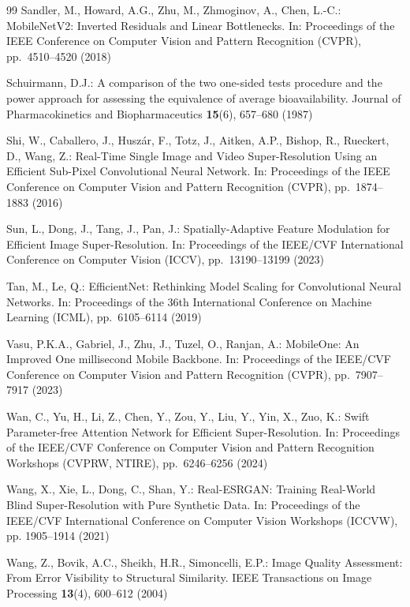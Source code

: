 \documentclass[11pt]{article}
\begin{document}
\begin{thebibliography}{99}
Sandler, M., Howard, A.G., Zhu, M., Zhmoginov, A., Chen, L.-C.:
MobileNetV2: Inverted Residuals and Linear Bottlenecks.
In: Proceedings of the IEEE Conference on Computer Vision and Pattern Recognition (CVPR), pp.\ 4510--4520 (2018)

Schuirmann, D.J.:
A comparison of the two one-sided tests procedure and the power approach for assessing the equivalence of average bioavailability.
Journal of Pharmacokinetics and Biopharmaceutics \textbf{15}(6), 657--680 (1987)

Shi, W., Caballero, J., Husz\'ar, F., Totz, J., Aitken, A.P., Bishop, R., Rueckert, D., Wang, Z.:
Real-Time Single Image and Video Super-Resolution Using an Efficient Sub-Pixel Convolutional Neural Network.
In: Proceedings of the IEEE Conference on Computer Vision and Pattern Recognition (CVPR), pp.\ 1874--1883 (2016)

Sun, L., Dong, J., Tang, J., Pan, J.:
Spatially-Adaptive Feature Modulation for Efficient Image Super-Resolution.
In: Proceedings of the IEEE/CVF International Conference on Computer Vision (ICCV), pp.\ 13190--13199 (2023)

Tan, M., Le, Q.:
EfficientNet: Rethinking Model Scaling for Convolutional Neural Networks.
In: Proceedings of the 36th International Conference on Machine Learning (ICML), pp.\ 6105--6114 (2019)

Vasu, P.K.A., Gabriel, J., Zhu, J., Tuzel, O., Ranjan, A.:
MobileOne: An Improved One millisecond Mobile Backbone.
In: Proceedings of the IEEE/CVF Conference on Computer Vision and Pattern Recognition (CVPR), pp.\ 7907--7917 (2023)

Wan, C., Yu, H., Li, Z., Chen, Y., Zou, Y., Liu, Y., Yin, X., Zuo, K.:
Swift Parameter-free Attention Network for Efficient Super-Resolution.
In: Proceedings of the IEEE/CVF Conference on Computer Vision and Pattern Recognition Workshops (CVPRW, NTIRE), pp.\ 6246--6256 (2024)

Wang, X., Xie, L., Dong, C., Shan, Y.:
Real-ESRGAN: Training Real-World Blind Super-Resolution with Pure Synthetic Data.
In: Proceedings of the IEEE/CVF International Conference on Computer Vision Workshops (ICCVW), pp. 1905--1914 (2021)

Wang, Z., Bovik, A.C., Sheikh, H.R., Simoncelli, E.P.:
Image Quality Assessment: From Error Visibility to Structural Similarity.
IEEE Transactions on Image Processing \textbf{13}(4), 600--612 (2004)


\end{thebibliography}
\end{document}
